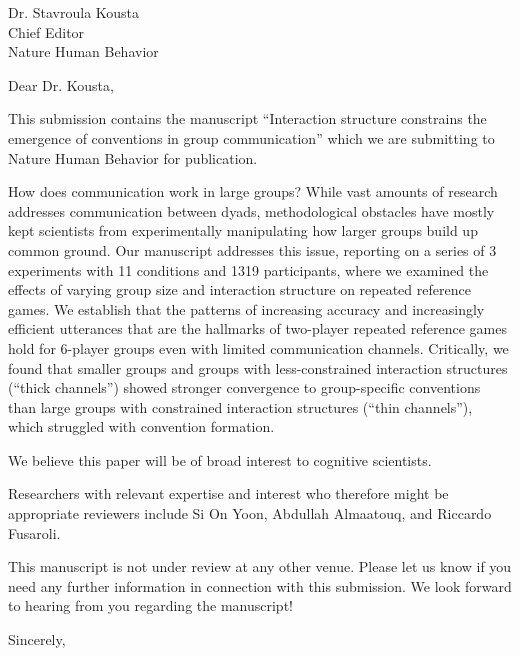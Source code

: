 \documentclass{stanfordletter}
\begin{document}
	\signature{Veronica Boyce \\ Robert Hawkins \\ Noah D. Goodman \\ Michael C. Frank}
	
	
	\begin{letter}{Dr. Stavroula Kousta \\ Chief Editor \\ Nature Human Behavior}
		
		
          \opening{Dear Dr. Kousta,} 
          This
          submission contains the manuscript ``Interaction structure constrains the emergence of conventions in group communication''
          which we are submitting to Nature Human Behavior for
          publication. 
          
          How does communication work in large groups? While vast amounts of research addresses communication between dyads, methodological obstacles have mostly kept scientists from experimentally manipulating how larger groups build up common ground. 
          Our manuscript addresses this issue, reporting on a series of 3 experiments with 11 conditions and 1319 participants, where we examined the effects of varying group size and interaction structure on repeated reference games. We establish that the patterns of increasing accuracy and increasingly efficient utterances that are the hallmarks of two-player repeated reference games hold for 6-player groups even with limited communication channels. Critically, we found that smaller groups and groups with less-constrained interaction structures (“thick channels”) showed stronger convergence to group-specific conventions than large groups with constrained interaction structures (“thin
          channels”), which struggled with convention formation.
          
          We believe this paper will be of broad
          interest to cognitive scientists.
		 
          Researchers with relevant expertise and interest who
          therefore might be appropriate reviewers include Si On Yoon, Abdullah Almaatouq, and 
		 Riccardo Fusaroli. 
		 
          This manuscript is not under review at any other
          venue. Please let us know if you need any further
          information in connection with this submission. We look
          forward to hearing from you regarding the manuscript!
          \closing{Sincerely,}
		
	\end{letter}
	
\end{document}
